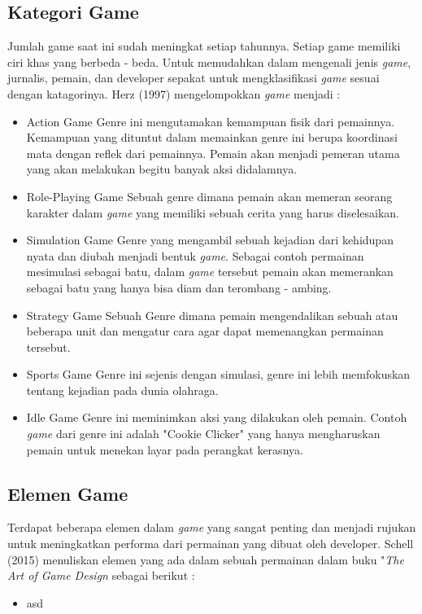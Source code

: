 	\subsection{Kategori Game}
	Jumlah game saat ini sudah meningkat setiap tahunnya. Setiap game memiliki ciri khas yang berbeda - beda. Untuk memudahkan dalam mengenali jenis \textit{game}, jurnalis, pemain, dan developer sepakat untuk mengklasifikasi \textit{game} sesuai dengan katagorinya. Herz (1997) mengelompokkan \textit{game} menjadi :
	\begin{itemize}
		\item Action Game
			\subitem Genre ini mengutamakan kemampuan fisik dari pemainnya. Kemampuan yang dituntut dalam memainkan genre ini berupa koordinasi mata dengan reflek dari pemainnya. Pemain akan menjadi pemeran utama yang akan melakukan begitu banyak aksi didalamnya.
		\item Role-Playing Game
			\subitem Sebuah genre dimana pemain akan memeran seorang karakter dalam \textit{game} yang memiliki sebuah cerita yang harus diselesaikan.
		\item Simulation Game
			\subitem Genre yang mengambil sebuah kejadian dari kehidupan nyata dan diubah menjadi bentuk \textit{game}. Sebagai contoh permainan mesimulasi sebagai batu, dalam \textit{game} tersebut pemain akan memerankan sebagai batu yang hanya bisa diam dan terombang - ambing.
		\item Strategy Game
			\subitem Sebuah Genre dimana pemain mengendalikan sebuah atau beberapa unit dan mengatur cara agar dapat memenangkan permainan tersebut.
		\item Sports Game
			\subitem Genre ini sejenis dengan simulasi, genre ini lebih memfokuskan tentang kejadian pada dunia olahraga.
		\item Idle Game
			\subitem Genre ini meminimkan aksi yang dilakukan oleh pemain. Contoh \textit{game} dari genre ini adalah "Cookie Clicker" yang hanya mengharuskan pemain untuk menekan layar pada perangkat kerasnya.
	\end{itemize}
	
	\subsection{Elemen Game}
	Terdapat beberapa elemen dalam \textit{game} yang sangat penting dan menjadi rujukan untuk meningkatkan performa dari permainan yang dibuat oleh developer. Schell (2015) menuliskan elemen yang ada dalam sebuah permainan dalam buku "\textit{The Art of Game Design} sebagai berikut :
	\begin{itemize}
		\item asd
	\end{itemize}
	
